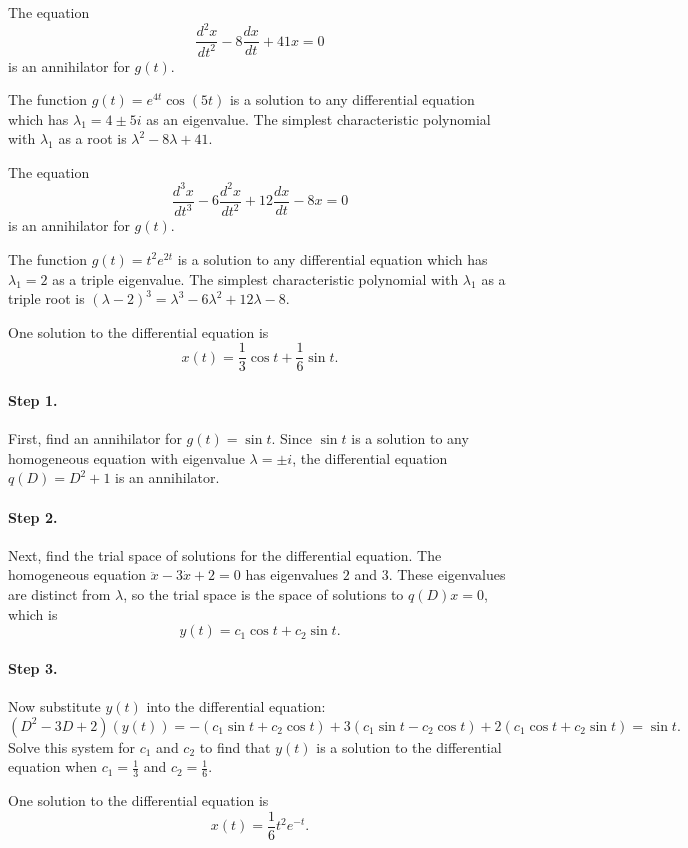 \ans The equation
\[
\frac{d^2x}{dt^2} - 8\frac{dx}{dt} + 41x = 0
\]
is an annihilator for $g(t)$.

\soln The function $g(t) = e^{4t}\cos(5t)$ is a solution to any differential
equation which has $\lambda_1 = 4 \pm 5i$ as an eigenvalue.  The
simplest characteristic polynomial with $\lambda_1$ as a root is
$\lambda^2 - 8\lambda + 41$.

 \ans The equation
\[
\frac{d^3x}{dt^3} - 6\frac{d^2x}{dt^2} + 12\frac{dx}{dt} - 8x = 0
\]
is an annihilator for $g(t)$.

\soln The function $g(t) = t^2e^{2t}$ is a solution to any differential
equation which has $\lambda_1 = 2$ as a triple eigenvalue.  The simplest
characteristic polynomial with $\lambda_1$ as a triple root is
$(\lambda - 2)^3 = \lambda^3 - 6\lambda^2 + 12\lambda - 8$.

 \ans One solution to the differential equation is
\[
x(t) = \frac{1}{3}\cos t + \frac{1}{6}\sin t.
\]

\soln
\paragraph{Step 1.} First, find an annihilator for $g(t) = \sin t$.  Since
$\sin t$ is a solution to any homogeneous equation with eigenvalue
$\lambda = \pm i$, the differential equation $q(D) = D^2 + 1$ is an
annihilator.

\paragraph{Step 2.} Next, find the trial space of solutions for the
differential equation.  The homogeneous equation $\ddot{x} - 3\dot{x}
+ 2 = 0$ has eigenvalues $2$ and $3$.  These eigenvalues are distinct
from $\lambda$, so the trial space is the space of solutions to $q(D)x
= 0$, which is
\[
y(t) = c_1\cos t + c_2\sin t.
\]
\paragraph{Step 3.} Now substitute $y(t)$ into the differential equation:
\[
(D^2 - 3D + 2)(y(t)) = -(c_1\sin t + c_2\cos t) + 3(c_1\sin t - c_2\cos t)
+ 2(c_1\cos t + c_2\sin t) = \sin t.
\]
Solve this system for $c_1$ and $c_2$ to find that $y(t)$ is a solution to
the differential equation when $c_1 = \frac{1}{3}$ and $c_2 = \frac{1}{6}$.

 \ans One solution to the differential equation is
\[
x(t) = \frac{1}{6}t^2e^{-t}.
\]

